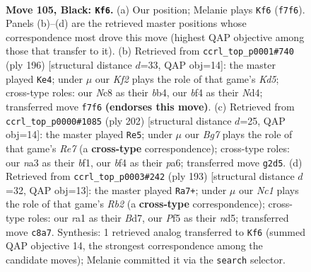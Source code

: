 \documentclass[11pt]{article}
\begin{document}
\clearpage

\begin{figure}[p]\centering
\begin{subfigure}{0.46\textwidth}\centering
\resizebox{\linewidth}{!}{%
\newchessgame
\chessboard[
  setfen={2n4K/5k2/p7/P4p1p/5B2/N5P1/5rb1/R7 b - - 21 105},
  showmover=false,
  pgfstyle=straightmove, color=movearrow, markmove={f7-f6}
]}
\caption{}
\end{subfigure}\hfill
\begin{subfigure}{0.46\textwidth}\centering
\resizebox{\linewidth}{!}{%
\newchessgame
\chessboard[
  setfen={6k1/5p2/5P2/p2K2P1/Pb1N3R/8/8/3r4 w - - 18 99},
  showmover=false,
  pgfstyle=straightmove, color=movearrow, markmove={d5-e4}
]}
\caption{}
\end{subfigure}
\\[4pt]
\begin{subfigure}{0.46\textwidth}\centering
\resizebox{\linewidth}{!}{%
\newchessgame
\chessboard[
  setfen={7k/1B2R3/p5p1/P1K3P1/8/8/8/3r1b2 w - - 58 102},
  showmover=false,
  pgfstyle=straightmove, color=movearrow, markmove={e7-e5}
]}
\caption{}
\end{subfigure}\hfill
\begin{subfigure}{0.46\textwidth}\centering
\resizebox{\linewidth}{!}{%
\newchessgame
\chessboard[
  setfen={7k/1r1b4/8/2pNP1b1/2P4p/K1P5/2B5/6R1 b - - 4 97},
  showmover=false,
  pgfstyle=straightmove, color=movearrow, markmove={b7-a7}
]}
\caption{}
\end{subfigure}
\caption{\textbf{Move 105, Black: \texttt{Kf6}.} (a) Our position; Melanie plays \texttt{Kf6} (\texttt{f7f6}). Panels (b)--(d) are the retrieved master positions whose correspondence most drove this move (highest QAP objective among those that transfer to it). (b) Retrieved from \texttt{ccrl\_top\_p0001\#740} (ply 196) [structural distance $d$=33, QAP obj=14]: the master played \texttt{Ke4}; under $\mu$ our \emph{Kf2} plays the role of that game's \emph{Kd5}; cross-type roles: our \emph{N}c8 as their \emph{b}b4, our \emph{b}f4 as their \emph{N}d4; transferred move \texttt{f7f6} \textbf{(endorses this move)}. (c) Retrieved from \texttt{ccrl\_top\_p0000\#1085} (ply 202) [structural distance $d$=25, QAP obj=14]: the master played \texttt{Re5}; under $\mu$ our \emph{Bg7} plays the role of that game's \emph{Re7} (a \textbf{cross-type} correspondence); cross-type roles: our \emph{n}a3 as their \emph{b}f1, our \emph{b}f4 as their \emph{p}a6; transferred move \texttt{g2d5}. (d) Retrieved from \texttt{ccrl\_top\_p0003\#242} (ply 193) [structural distance $d$=32, QAP obj=13]: the master played \texttt{Ra7+}; under $\mu$ our \emph{Nc1} plays the role of that game's \emph{Rb2} (a \textbf{cross-type} correspondence); cross-type roles: our \emph{r}a1 as their \emph{B}d7, our \emph{P}f5 as their \emph{n}d5; transferred move \texttt{c8a7}. Synthesis: 1 retrieved analog transferred to \texttt{Kf6} (summed QAP objective 14, the strongest correspondence among the candidate moves); Melanie committed it via the \texttt{search} selector.}
\label{fig:thought-m209}
\end{figure}
\end{document}
